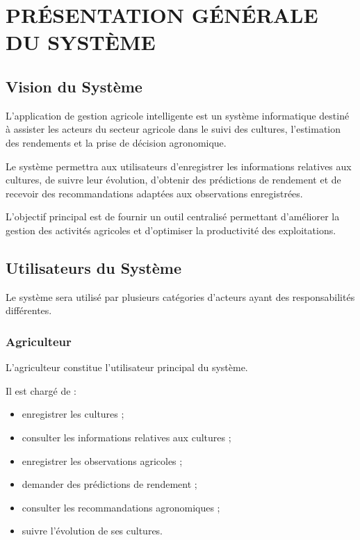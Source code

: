 \documentclass[12pt,a4paper]{report}
\begin{document}
\chapter{PRÉSENTATION GÉNÉRALE DU
SYSTÈME}\label{chapitre-3-pruxe9sentation-guxe9nuxe9rale-du-systuxe8me}

\section{Vision du Système}\label{vision-du-systuxe8me}

L'application de gestion agricole intelligente est un système
informatique destiné à assister les acteurs du secteur agricole dans le
suivi des cultures, l'estimation des rendements et la prise de décision
agronomique.

Le système permettra aux utilisateurs d'enregistrer les informations
relatives aux cultures, de suivre leur évolution, d'obtenir des
prédictions de rendement et de recevoir des recommandations adaptées aux
observations enregistrées.

L'objectif principal est de fournir un outil centralisé permettant
d'améliorer la gestion des activités agricoles et d'optimiser la
productivité des exploitations.

\section{Utilisateurs du Système}\label{utilisateurs-du-systuxe8me}

Le système sera utilisé par plusieurs catégories d'acteurs ayant des
responsabilités différentes.

\subsection{Agriculteur}\label{agriculteur}

L'agriculteur constitue l'utilisateur principal du système.

Il est chargé de :

\begin{itemize}
\item
  enregistrer les cultures ;
\item
  consulter les informations relatives aux cultures ;
\item
  enregistrer les observations agricoles ;
\item
  demander des prédictions de rendement ;
\item
  consulter les recommandations agronomiques ;
\item
  suivre l'évolution de ses cultures.
\end{itemize}
\end{document}
